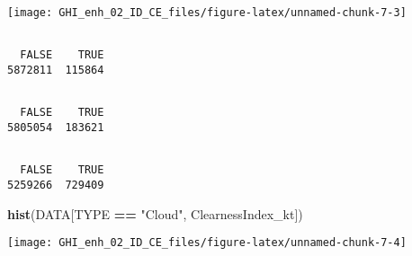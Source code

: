 \documentclass[
  10pt,
  a4paper,oneside]{article}
\newenvironment{Shaded}{\begin{snugshade}}{\end{snugshade}}
\newcommand{\DocumentationTok}[1]{\textcolor[rgb]{0.56,0.35,0.01}{\textbf{\textit{#1}}}}
\newcommand{\FunctionTok}[1]{\textcolor[rgb]{0.13,0.29,0.53}{\textbf{#1}}}
\newcommand{\NormalTok}[1]{#1}
\newcommand{\SpecialCharTok}[1]{\textcolor[rgb]{0.81,0.36,0.00}{\textbf{#1}}}
\newcommand{\StringTok}[1]{\textcolor[rgb]{0.31,0.60,0.02}{#1}}
\begin{document}
\begin{center}\texttt{[image: GHI\_enh\_02\_ID\_CE\_files/figure-latex/unnamed-chunk-7-3]} \end{center}

\begin{Shaded}
\end{Shaded}

\begin{verbatim}

  FALSE    TRUE 
5872811  115864 
\end{verbatim}

\begin{Shaded}
\end{Shaded}

\begin{verbatim}

  FALSE    TRUE 
5805054  183621 
\end{verbatim}

\begin{Shaded}
\end{Shaded}

\begin{verbatim}

  FALSE    TRUE 
5259266  729409 
\end{verbatim}

\begin{Shaded}
\begin{Highlighting}[]
\FunctionTok{hist}\NormalTok{(DATA[TYPE }\SpecialCharTok{==} \StringTok{"Cloud"}\NormalTok{, ClearnessIndex\_kt])}
\end{Highlighting}
\end{Shaded}

\begin{center}\texttt{[image: GHI\_enh\_02\_ID\_CE\_files/figure-latex/unnamed-chunk-7-4]} \end{center}
\end{document}
